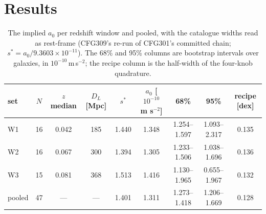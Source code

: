 \documentclass[10pt]{article}
\begin{document}
\section{Results}\label{sec:results}

\begin{table}[t]
\centering\small
\setlength{\tabcolsep}{4pt}
\begin{tabular}{lcccccccc}
\toprule
set & $N$ & $z$ median & $D_L$ [Mpc] & $s^*$ & $a_0$ [$10^{-10}$ m s$^{-2}$] & 68\% & 95\% & recipe [dex] \\
\midrule
W1 & 16 & 0.042 & 185 & 1.440 & 1.348 & 1.254--1.597 & 1.093--2.317 & 0.135 \\
W2 & 16 & 0.067 & 300 & 1.394 & 1.305 & 1.233--1.506 & 1.038--1.696 & 0.136 \\
W3 & 15 & 0.081 & 368 & 1.513 & 1.416 & 1.130--1.965 & 0.655--1.967 & 0.132 \\
pooled & 47 & --- & --- & 1.401 & 1.311 & 1.273--1.418 & 1.206--1.669 & 0.128 \\
\bottomrule
\end{tabular}
\caption{The implied $a_0$ per redshift window and pooled, with the catalogue widths read as rest-frame (CFG309's re-run of CFG301's committed chain; $s^*=a_0/9.3603\times10^{-11}$). The 68\% and 95\% columns are bootstrap intervals over galaxies, in $10^{-10}$\,m\,s$^{-2}$; the recipe column is the half-width of the four-knob quadrature.}
\label{tab:res}
\end{table}
\end{document}
